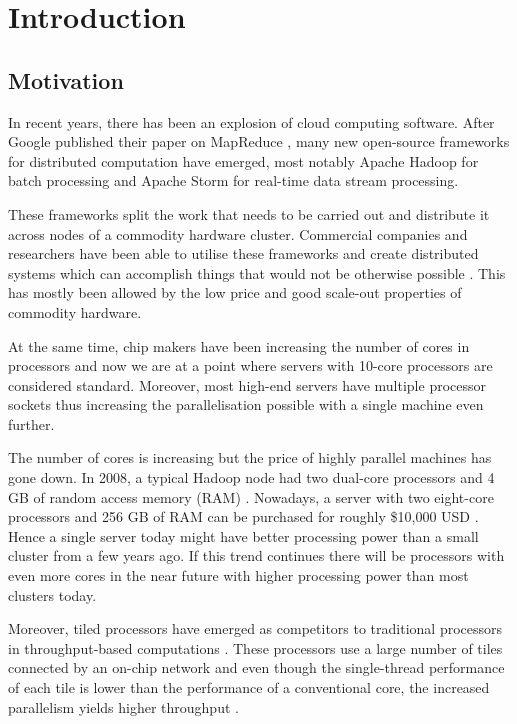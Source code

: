 \documentclass[bsc,logo,frontabs,twoside,singlespacing,normalheadings,parskip]{infthesis}\usepackage[]{graphicx}\usepackage[]{color}
\begin{document}
\cleardoublepage
{}

\clearpage{}\chapter{Introduction}

\section{Motivation}

In recent years, there has been an explosion of cloud computing software. After Google published their paper on MapReduce \citep{dean2010mapreduce}, many new open-source frameworks for distributed computation have emerged, most notably Apache Hadoop \citep{ApacheHadoop} for batch processing and Apache Storm \citep{ApacheStorm} for real-time data stream processing.

These frameworks split the work that needs to be carried out and distribute it across nodes of a commodity hardware cluster. Commercial companies and researchers have been able to utilise these frameworks and create distributed systems which can accomplish things that would not be otherwise possible \citep{Solovey}. This has mostly been allowed by the low price and good scale-out properties of commodity hardware.

At the same time, chip makers have been increasing the number of cores in processors and now we are at a point where servers with 10-core processors are considered standard. Moreover, most high-end servers have multiple processor sockets thus increasing the parallelisation possible with a single machine even further.

The number of cores is increasing but the price of highly parallel machines has gone down. In 2008, a typical Hadoop node had two dual-core processors and 4 GB of random access memory (RAM) \citep{Kumar:2013:HSD:2536274.2536314}. Nowadays, a server with two eight-core processors and 256 GB of RAM can be purchased for roughly \$10,000 USD \citep{Kumar:2013:HSD:2536274.2536314}. Hence a single server today might have better processing power than a small cluster from a few years ago. If this trend continues there will be processors with even more cores in the near future with higher processing power than most clusters today.

Moreover, tiled processors have emerged as competitors to traditional processors in throughput-based computations \cite{Tilera}. These processors use a large number of tiles connected by an on-chip network and even though the single-thread performance of each tile is lower than the performance of a conventional core, the increased parallelism yields higher throughput \cite{DBLP:conf/isca/Lotfi-KamranGFVKPAJIOF12}.
\end{document}
